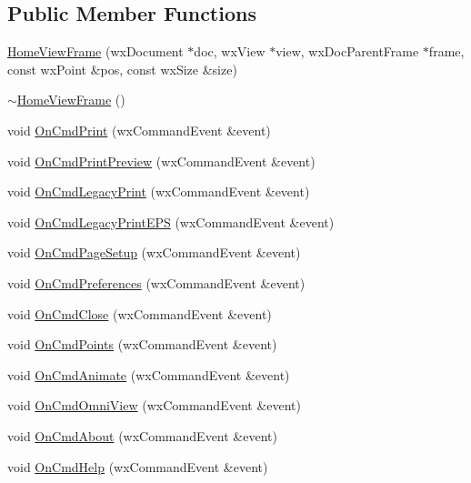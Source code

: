 \subsection*{Public Member Functions}
\begin{DoxyCompactItemize}
\item 
\hyperlink{a00107_af540b46cfbd777c59f7e77758895a38e}{Home\-View\-Frame} (wx\-Document $\ast$doc, wx\-View $\ast$view, wx\-Doc\-Parent\-Frame $\ast$frame, const wx\-Point \&pos, const wx\-Size \&size)
\item 
\hyperlink{a00107_aea0718193139a67c14bcb8c1709154f4}{$\sim$\-Home\-View\-Frame} ()
\item 
void \hyperlink{a00107_a9d4184da0e0d764fa85a26d2a4109bae}{On\-Cmd\-Print} (wx\-Command\-Event \&event)
\item 
void \hyperlink{a00107_a3cddaf7cb2b7639e34b150372061d4df}{On\-Cmd\-Print\-Preview} (wx\-Command\-Event \&event)
\item 
void \hyperlink{a00107_aba2066c11cc3ac3d14bcd316eeff4e5d}{On\-Cmd\-Legacy\-Print} (wx\-Command\-Event \&event)
\item 
void \hyperlink{a00107_ae039261dbf303fa9f32d53dbec67ad81}{On\-Cmd\-Legacy\-Print\-E\-P\-S} (wx\-Command\-Event \&event)
\item 
void \hyperlink{a00107_a81c1b19c408062f7b4c1b1bb889115fc}{On\-Cmd\-Page\-Setup} (wx\-Command\-Event \&event)
\item 
void \hyperlink{a00107_ace99ad016ad0d63c35cbaaab75e43cf2}{On\-Cmd\-Preferences} (wx\-Command\-Event \&event)
\item 
void \hyperlink{a00107_aecdf6fe903b7697b26b0c72a11e9d0e5}{On\-Cmd\-Close} (wx\-Command\-Event \&event)
\item 
void \hyperlink{a00107_add615ff1c7139c25d54ea87ae1a7886c}{On\-Cmd\-Points} (wx\-Command\-Event \&event)
\item 
void \hyperlink{a00107_a40e7e4e6fe70acc8b24811f4cad5d43b}{On\-Cmd\-Animate} (wx\-Command\-Event \&event)
\item 
void \hyperlink{a00107_a7826885c08b55d8ce07cc1beab5ce5f7}{On\-Cmd\-Omni\-View} (wx\-Command\-Event \&event)
\item 
void \hyperlink{a00107_ae828aae3ce5c566cd6d39c1f0a692a7d}{On\-Cmd\-About} (wx\-Command\-Event \&event)
\item 
void \hyperlink{a00107_a439aca57318f27d53e2bbe036079b19f}{On\-Cmd\-Help} (wx\-Command\-Event \&event)
\end{DoxyCompactItemize}



